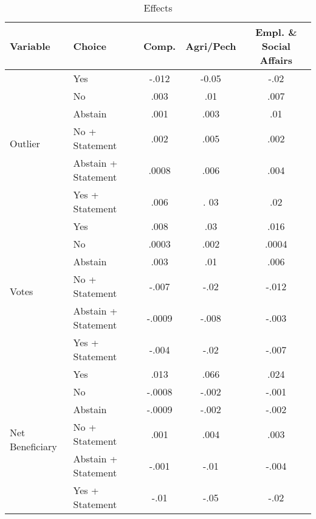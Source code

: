 \begin{table}[htp]
  \centering
  \begin{tabular}{l l c c c}
  Variable & Choice &   Comp. & Agri/Pech & Empl. \& Social Affairs \\ \hline
\multirow{6}{*}{Outlier} & Yes & -.012 & -0.05 & -.02 \\
                                     & No  & .003 & .01 & .007 \\
                                     & Abstain & .001 & .003 & .01 \\
                                     & No + Statement & .002 & .005 & .002 \\
                                     & Abstain + Statement & .0008 & .006 & .004 \\
                                     & Yes + Statement & .006 & . 03 & .02 \\
 \multirow{6}{*}{Votes} & Yes & .008 & .03 & .016 \\
                                    & No & .0003 & .002 & .0004 \\
                                    & Abstain & .003 & .01 & .006 \\
                                    & No + Statement & -.007 & -.02 & -.012 \\
                                    & Abstain + Statement & -.0009 & -.008 & -.003 \\
                                    & Yes + Statement & -.004 & -.02 & -.007 \\
\multirow{6}{*}{Net Beneficiary} & Yes & .013 & .066 & .024 \\
                                                 & No & -.0008 & -.002 & -.001 \\
                                                 & Abstain & -.0009 &-.002 & -.002 \\
                                                 & No + Statement & .001 & .004 & .003 \\
                                                 & Abstain + Statement & -.001 & -.01 & -.004 \\
                                                 & Yes + Statement & -.01 & -.05 & -.02 \\ \hline
  \end{tabular}
  \caption{Effects}
  \label{tab:effects}
\end{table}

